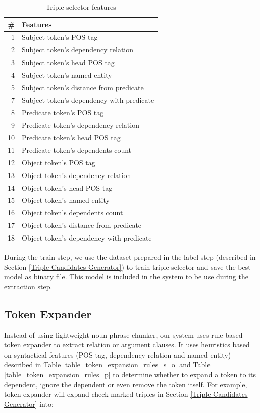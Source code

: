 \documentclass[conference,compsoc]{IEEEtran}
\begin{document}
\begin{table}[!t]
\renewcommand{\arraystretch}{1.5}
\caption{Triple selector features}
\label{table_models_features}
\centering
\begin{tabular}{r|l}
\hline
\textbf{\#} & \textbf{Features} \\
\hline
1 & Subject token's POS tag \\
2 & Subject token's dependency relation \\
3 & Subject token's head POS tag \\
4 & Subject token's named entity \\
5 & Subject token's distance from predicate \\
7 & Subject token's dependency with predicate \\
8 & Predicate token's POS tag \\
9 & Predicate token's dependency relation \\
10 & Predicate token's head POS tag \\
11 & Predicate token's dependents count \\
12 & Object token's POS tag \\
13 & Object token's dependency relation \\
14 & Object token's head POS tag \\
15 & Object token's named entity \\
16 & Object token's dependents count \\
17 & Object token's distance from predicate \\
18 & Object token's dependency with predicate \\
\end{tabular}
\end{table}

During the train step, we use the dataset prepared in the label step (described in Section \ref{Triple Candidates Generator}) to train triple selector and save the best model as binary file. This model is included in the system to be use during the extraction step.

\subsection{Token Expander}

Instead of using lightweight noun phrase chunker\cite{banko2007open}, our system uses rule-based token expander to extract relation or argument clauses. It uses heuristics based on syntactical features (POS tag, dependency relation and named-entity) described in Table \ref{table_token_expansion_rules_s_o} and Table \ref{table_token_expansion_rules_p} to determine whether to expand a token to its dependent, ignore the dependent or even remove the token itself. For example, token expander will expand check-marked triples in Section \ref{Triple Candidates Generator} into:
\end{document}
